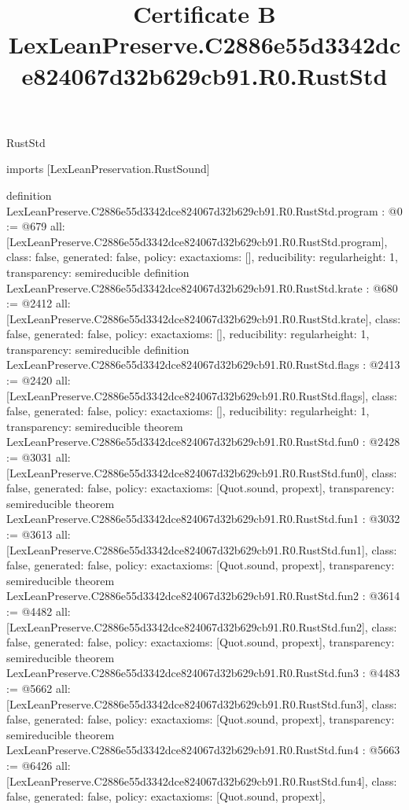 \begin{lexlean}{RustStd}
\title{Certificate B LexLeanPreserve.C2886e55d3342dce824067d32b629cb91.R0.RustStd}
\begin{coremodule}
imports [LexLeanPreservation.RustSound]

definition LexLeanPreserve.C2886e55d3342dce824067d32b629cb91.R0.RustStd.program : @0 := @679 {
  all: [LexLeanPreserve.C2886e55d3342dce824067d32b629cb91.R0.RustStd.program],
  class: false,
  generated: false,
  policy: exact{axioms: []},
  reducibility: regular{height: 1},
  transparency: semireducible
}
definition LexLeanPreserve.C2886e55d3342dce824067d32b629cb91.R0.RustStd.krate : @680 := @2412 {
  all: [LexLeanPreserve.C2886e55d3342dce824067d32b629cb91.R0.RustStd.krate],
  class: false,
  generated: false,
  policy: exact{axioms: []},
  reducibility: regular{height: 1},
  transparency: semireducible
}
definition LexLeanPreserve.C2886e55d3342dce824067d32b629cb91.R0.RustStd.flags : @2413 := @2420 {
  all: [LexLeanPreserve.C2886e55d3342dce824067d32b629cb91.R0.RustStd.flags],
  class: false,
  generated: false,
  policy: exact{axioms: []},
  reducibility: regular{height: 1},
  transparency: semireducible
}
theorem LexLeanPreserve.C2886e55d3342dce824067d32b629cb91.R0.RustStd.fun0 : @2428 := @3031 {
  all: [LexLeanPreserve.C2886e55d3342dce824067d32b629cb91.R0.RustStd.fun0],
  class: false,
  generated: false,
  policy: exact{axioms: [Quot.sound, propext]},
  transparency: semireducible
}
theorem LexLeanPreserve.C2886e55d3342dce824067d32b629cb91.R0.RustStd.fun1 : @3032 := @3613 {
  all: [LexLeanPreserve.C2886e55d3342dce824067d32b629cb91.R0.RustStd.fun1],
  class: false,
  generated: false,
  policy: exact{axioms: [Quot.sound, propext]},
  transparency: semireducible
}
theorem LexLeanPreserve.C2886e55d3342dce824067d32b629cb91.R0.RustStd.fun2 : @3614 := @4482 {
  all: [LexLeanPreserve.C2886e55d3342dce824067d32b629cb91.R0.RustStd.fun2],
  class: false,
  generated: false,
  policy: exact{axioms: [Quot.sound, propext]},
  transparency: semireducible
}
theorem LexLeanPreserve.C2886e55d3342dce824067d32b629cb91.R0.RustStd.fun3 : @4483 := @5662 {
  all: [LexLeanPreserve.C2886e55d3342dce824067d32b629cb91.R0.RustStd.fun3],
  class: false,
  generated: false,
  policy: exact{axioms: [Quot.sound, propext]},
  transparency: semireducible
}
theorem LexLeanPreserve.C2886e55d3342dce824067d32b629cb91.R0.RustStd.fun4 : @5663 := @6426 {
  all: [LexLeanPreserve.C2886e55d3342dce824067d32b629cb91.R0.RustStd.fun4],
  class: false,
  generated: false,
  policy: exact{axioms: [Quot.sound, propext]},
}
\end{coremodule}
\end{lexlean}
